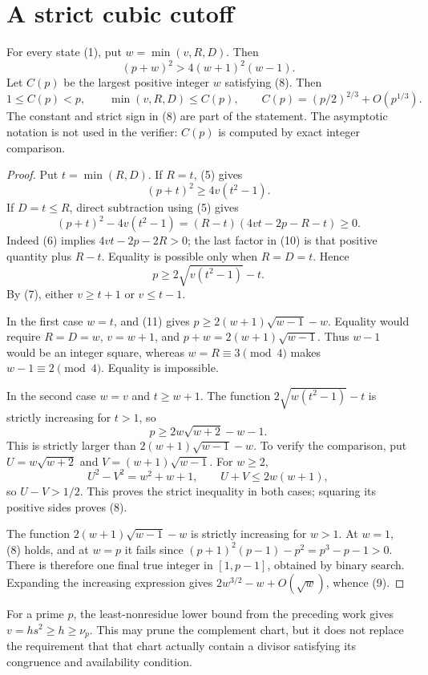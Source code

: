 \section{A strict cubic cutoff}
\begin{theorem}\label{thm:cubic}
For every state (1), put $w=\min(v,R,D)$. Then
\[
 \boxed{(p+w)^2>4(w+1)^2(w-1).}                         \tag{8}
\]
Let $C(p)$ be the largest positive integer $w$ satisfying (8). Then
\[
 1\le C(p)<p,\qquad \min(v,R,D)\le C(p),
 \qquad C(p)=(p/2)^{2/3}+O(p^{1/3}).                    \tag{9}
\]
The constant and strict sign in (8) are part of the statement. The asymptotic
notation is not used in the verifier: $C(p)$ is computed by exact integer
comparison.
\end{theorem}
\begin{proof}
Put $t=\min(R,D)$. If $R=t$, (5) gives
\[
 (p+t)^2\ge4v(t^2-1).
\]
If $D=t\le R$, direct subtraction using (5) gives
\[
 (p+t)^2-4v(t^2-1)
 =(R-t)(4vt-2p-R-t)\ge0.                                \tag{10}
\]
Indeed (6) implies $4vt-2p-2R>0$; the last factor in (10) is that positive
quantity plus $R-t$. Equality is possible only when $R=D=t$. Hence
\[
 p\ge 2\sqrt{v(t^2-1)}-t.                               \tag{11}
\]
By (7), either $v\ge t+1$ or $v\le t-1$.

In the first case $w=t$, and (11) gives
$p\ge2(w+1)\sqrt{w-1}-w$.
Equality would require $R=D=w$, $v=w+1$, and
$p+w=2(w+1)\sqrt{w-1}$. Thus $w-1$ would be an integer square, whereas
$w=R\equiv3\pmod4$ makes $w-1\equiv2\pmod4$. Equality is impossible.

In the second case $w=v$ and $t\ge w+1$. The function
$2\sqrt{w(t^2-1)}-t$ is strictly increasing for $t>1$, so
\[
 p\ge2w\sqrt{w+2}-w-1.
\]
This is strictly larger than $2(w+1)\sqrt{w-1}-w$. To verify the comparison,
put $U=w\sqrt{w+2}$ and $V=(w+1)\sqrt{w-1}$. For $w\ge2$,
\[
 U^2-V^2=w^2+w+1,\qquad U+V\le2w(w+1),
\]
so $U-V>1/2$. This proves the strict inequality in both cases; squaring its
positive sides proves (8).

The function $2(w+1)\sqrt{w-1}-w$ is strictly increasing for $w>1$.
At $w=1$, (8) holds, and at $w=p$ it fails since
$(p+1)^2(p-1)-p^2=p^3-p-1>0$. There is therefore one final true integer in
$[1,p-1]$, obtained by binary search. Expanding the increasing expression gives
$2w^{3/2}-w+O(\sqrt w)$, whence (9).
\end{proof}

For a prime $p$, the least-nonresidue lower bound from the preceding work gives
$v=hs^2\ge h\ge\nu_p$. This may prune the complement chart, but it does not
replace the requirement that that chart actually contain a divisor satisfying
its congruence and availability condition.

